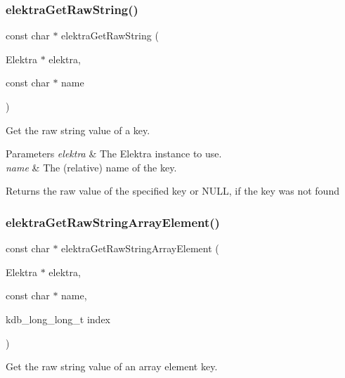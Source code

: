 \subsubsection{\texorpdfstring{elektra\+Get\+Raw\+String()}{elektraGetRawString()}}
{\footnotesize\ttfamily const char $\ast$ elektra\+Get\+Raw\+String (\begin{DoxyParamCaption}\item[{Elektra $\ast$}]{elektra,  }\item[{const char $\ast$}]{name }\end{DoxyParamCaption})}



Get the raw string value of a key. 


\begin{DoxyParams}{Parameters}
{\em elektra} & The Elektra instance to use. \\
\hline
{\em name} & The (relative) name of the key. \\
\hline
\end{DoxyParams}
\begin{DoxyReturn}{Returns}
the raw value of the specified key or N\+U\+LL, if the key was not found 
\end{DoxyReturn}
\mbox{\label{group__highlevel_ga1b704f49a8e87262b670cd191ba61bb3}} 
\subsubsection{\texorpdfstring{elektra\+Get\+Raw\+String\+Array\+Element()}{elektraGetRawStringArrayElement()}}
{\footnotesize\ttfamily const char $\ast$ elektra\+Get\+Raw\+String\+Array\+Element (\begin{DoxyParamCaption}\item[{Elektra $\ast$}]{elektra,  }\item[{const char $\ast$}]{name,  }\item[{kdb\+\_\+long\+\_\+long\+\_\+t}]{index }\end{DoxyParamCaption})}



Get the raw string value of an array element key. 


